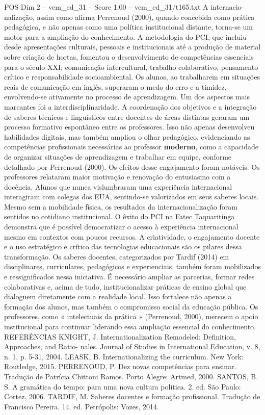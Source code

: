 \begin{textsample}{POS Dim 2 – vem\_ed\_31 – Score 1.00 – vem\_ed\_31/t165.txt}
A internacio- nalização, assim como afirma Perrenoud (2000), quando concebida como prática pedagógica, e não apenas como uma política institucional distante, torna-se um motor para a ampliação do conhecimento.
A metodologia do PCI, que incluiu desde apresentações culturais, pessoais e institucionais até a produção de material sobre criação de hortas, fomentou o desenvolvimento de competências essenciais para o século XXI: comunicação intercultural, trabalho colaborativo, pensamento crítico e responsabilidade socioambiental.
Os alunos, ao trabalharem em situações reais de comunicação em inglês, superaram o medo do erro e a timidez, envolvendo-se ativamente no processo de aprendizagem.
Um dos aspectos mais marcantes foi a interdisciplinaridade.
A coordenação dos objetivos e a integração de saberes técnicos e linguísticos entre docentes de áreas distintas geraram um processo formativo espontâneo entre os professores.
Isso não apenas desenvolveu habilidades digitais, mas também ampliou o olhar pedagógico, evidenciando as competências profissionais necessárias ao professor \textbf{moderno}, como a capacidade de organizar situações de aprendizagem e trabalhar em equipe, conforme detalhado por Perrenoud (2000).
Os efeitos desse engajamento foram notáveis.
Os professores relataram maior motivação e renovação do entusiasmo com a docência.
Alunos que nunca vislumbraram uma experiência internacional interagiram com colegas dos EUA, sentindo-se valorizados em seus saberes locais.
Mesmo sem a mobilidade física, os resultados da internacionalização foram sentidos no cotidiano institucional.
O êxito do PCI na Fatec Taquaritinga demonstra que é possível democratizar o acesso à experiência internacional mesmo em contextos com poucos recursos.
A criatividade, o engajamento docente e o uso estratégico e crítico das tecnologias educacionais são os pilares dessa transformação.
Os saberes docentes, categorizados por Tardif (2014) em disciplinares, curriculares, pedagógicos e experienciais, também foram mobilizados e ressignificados nessa iniciativa.
É necessário ampliar as parcerias, formar redes colaborativas e, acima de tudo, institucionalizar práticas de ensino global que dialoguem diretamente com a realidade local.
Isso fortalece não apenas a formação dos alunos, mas também o compromisso social da educação pública.
Os professores, como « intelectuais da prática » (Perrenoud, 2000), merecem o apoio institucional para continuar liderando essa ampliação essencial do conhecimento.
REFERÊNCIAS KNIGHT, J.
Internationalization Remodeled: Definition, Approaches, and Ratio- nales.
Journal of Studies in International Education, v. 8, n. 1, p. 5-31, 2004.
LEASK, B.
Internationalizing the curriculum.
New York: Routledge, 2015.
PERRENOUD, P.
Dez novas competências para ensinar.
Tradução de Patrícia Chittoni Ramos.
Porto Alegre: Artmed, 2000.
SANTOS, B.
S.
A gramática do tempo: para uma nova cultura política. 2. ed.
São Paulo: Cortez, 2006.
TARDIF, M.
Saberes docentes e formação profissional.
Tradução de Francisco Pereira. 14. ed.
Petrópolis: Vozes, 2014.

\end{textsample}
